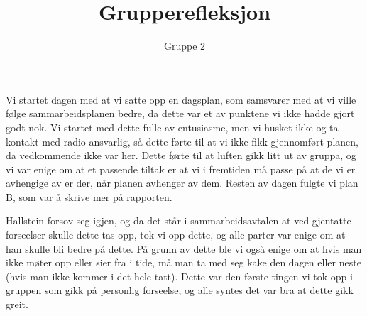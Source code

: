 \documentclass[10pt,a4paper]{article}
\title{Grupperefleksjon}
\author{Gruppe 2}
\begin{document}
\maketitle

Vi startet dagen med at vi satte opp en dagsplan, som samsvarer med at vi ville følge sammarbeidsplanen bedre, da dette var et av punktene vi ikke hadde gjort godt nok. Vi startet med dette fulle av entusiasme, men vi husket ikke og ta kontakt med radio-ansvarlig, så dette førte til at vi ikke fikk gjennomført planen, da vedkommende ikke var her. Dette førte til at luften gikk litt ut av gruppa, og vi var enige om at et passende tiltak er at vi i fremtiden må passe på at de vi er avhengige av er der, når planen avhenger av dem. Resten av dagen fulgte vi plan B, som var å skrive mer på rapporten.

Hallstein forsov seg igjen, og da det står i sammarbeidsavtalen at ved gjentatte forseelser skulle dette tas opp, tok vi opp dette, og alle parter var enige om at han skulle bli bedre på dette. På grunn av dette ble vi også enige om at hvis man ikke møter opp eller sier fra i tide, må man ta med seg kake den dagen eller neste (hvis man ikke kommer i det hele tatt). Dette var den første tingen vi tok opp i gruppen som gikk på personlig forseelse, og alle syntes det var bra at dette gikk greit.




\end{document}
